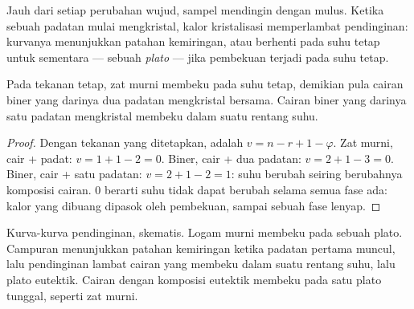 Jauh dari setiap perubahan wujud, sampel mendingin dengan mulus. Ketika
sebuah padatan mulai mengkristal, kalor kristalisasi memperlambat
pendinginan: kurvanya menunjukkan patahan kemiringan, atau berhenti pada
suhu tetap untuk sementara --- sebuah \textit{plato} --- jika pembekuan
terjadi pada suhu tetap.

\begin{proposition}[Plato]\label{prop:b2:solid-liquid-diagrams:plateaus}
Pada tekanan tetap, zat murni membeku pada suhu tetap, demikian pula
cairan biner yang darinya dua padatan mengkristal bersama. Cairan biner
yang darinya satu padatan mengkristal membeku dalam suatu rentang suhu.
\end{proposition}

\begin{proof}
Dengan tekanan yang ditetapkan,  adalah $v = n - r + 1 - \varphi$.
Zat murni, cair + padat: $v = 1 + 1 - 2 = 0$. Biner, cair + dua padatan:
$v = 2 + 1 - 3 = 0$. Biner, cair + satu padatan: $v = 2 + 1 - 2 = 1$: suhu
berubah seiring berubahnya komposisi cairan.  0 berarti suhu tidak
dapat berubah selama semua fase ada: kalor yang dibuang dipasok oleh
pembekuan, sampai sebuah fase lenyap.
\end{proof}

\begin{omfigure}

{\small Kurva-kurva pendinginan, skematis. Logam murni membeku pada sebuah
plato. Campuran menunjukkan patahan kemiringan ketika padatan pertama
muncul, lalu pendinginan lambat cairan yang membeku dalam suatu rentang
suhu, lalu plato eutektik. Cairan dengan komposisi eutektik membeku pada
satu plato tunggal, seperti zat murni.}
\end{omfigure}

